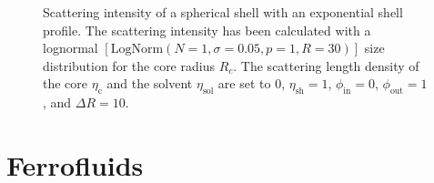 \begin{figure}[htb]
\begin{center}
\hfill
{}
\end{center}
\caption{Scattering intensity of a spherical shell with an exponential shell profile. The scattering intensity has been calculated
with a lognormal $[\mathrm{LogNorm}(N\!=\!1,\sigma\!=\!0.05,p\!=\!1,R\!=\!30)]$ size distribution for the core radius $R_c$.
The scattering length density of the core $\eta_\text{c}$ and the solvent $\eta_\text{sol}$ are set to 0, $\eta_\text{sh}=1$,
$\phi_\text{in}=0$,  $\phi_\text{out}=1$, and $\Delta R =10$.}
\label{fig:ExpShellExample}
\end{figure}


\clearpage
\section{Ferrofluids} \hspace{1pt}
\label{sec:ferrofluid}

\clearpage

